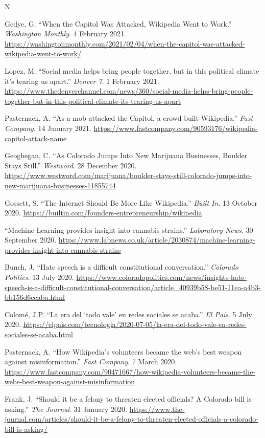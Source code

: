 \documentclass{cv}
\begin{document}
\begin{entries}{N}
		\item Gedye, G. ``When the Capitol Was Attacked, Wikipedia Went to Work.'' \textit{Washington Monthly}. 4 February 2021. \url{https://washingtonmonthly.com/2021/02/04/when-the-capitol-was-attacked-wikipedia-went-to-work/}
		\item Lopez, M. ``Social media helps bring people together, but in this political climate it's tearing us apart.'' \textit{Denver 7}. 1 February 2021. \url{https://www.thedenverchannel.com/news/360/social-media-helps-bring-people-together-but-in-this-political-climate-its-tearing-us-apart}
		\item Pasternack, A. ``As a mob attacked the Capitol, a crowd built Wikipedia.'' \textit{Fast Company}. 14 January 2021. \url{https://www.fastcompany.com/90593176/wikipedia-capitol-attack-name}
		\item Geoghegan, C. ``As Colorado Jumps Into New Marijuana Businesses, Boulder Stays Still.'' \textit{Westword}. 28 December 2020. \url{https://www.westword.com/marijuana/boulder-stays-still-colorado-jumps-into-new-marijuana-businesses-11855744}
		\item Gossett, S. ``The Internet Should Be More Like Wikipedia.'' \textit{Built In}. 13 October 2020. \url{https://builtin.com/founders-entrepreneurship/wikipedia}
		\item ``Machine Learning provides insight into cannabis strains.'' \textit{Laboratory News}. 30 September 2020. \url{https://www.labnews.co.uk/article/2030874/machine-learning-provides-insight-into-cannabis-strains}
		\item Bunch, J. ``Hate speech is a difficult constitutional conversation.'' \textit{Colorado Politics}. 13 July 2020. \url{https://www.coloradopolitics.com/news/insights-hate-speech-is-a-difficult-constitutional-conversation/article_40939b58-be51-11ea-a4b3-bb156d6ccaba.html}
		\item Colom\'{e}, J.P. ``La era del `todo vale' en redes sociales se acaba.'' \textit{El Pa\'{i}s}. 5 July 2020. \url{https://elpais.com/tecnologia/2020-07-05/la-era-del-todo-vale-en-redes-sociales-se-acaba.html}
		\item Pasternack, A. ``How Wikipedia's volunteers became the web's best weapon against misinformation.'' \textit{Fast Company}. 7 March 2020. \url{https://www.fastcompany.com/90471667/how-wikipedia-volunteers-became-the-webs-best-weapon-against-misinformation}
		\item Frank, J. ``Should it be a felony to threaten elected officials? A Colorado bill is asking.'' \textit{The Journal}. 31 January 2020. \url{https://www.the-journal.com/articles/should-it-be-a-felony-to-threaten-elected-officials-a-colorado-bill-is-asking/}

\end{entries}
\end{document}
